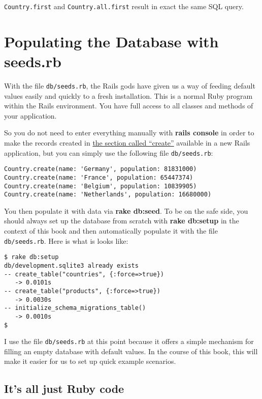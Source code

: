 \documentclass[a4paper]{book}
\newcounter{tab}[chapter]
\newcommand{\chap}[1]{\newpage\thispagestyle{empty}\chapter{#1}\label{chap:\thechapter}}
\begin{document}
\texttt{Country.first} and \texttt{Country.all.first} result in exact the same SQL query.

\chap{Populating the Database with seeds.rb}\label{populating-the-database-with-seeds.rb}

With the file \texttt{db/seeds.rb}, the Rails gods have given us a way of feeding default values easily and quickly to a fresh installation. This is a normal Ruby program within the Rails environment. You have full access to all classes and methods of your application.

So you do not need to enter everything manually with \textbf{rails console} in order to make the records created in \hyperref[activerecordux5fcreate]{the section called “create”} available in a new Rails application, but you can simply use the following file \texttt{db/seeds.rb}:

\begin{shaded}\begin{verbatim}
Country.create(name: 'Germany', population: 81831000)
Country.create(name: 'France', population: 65447374)
Country.create(name: 'Belgium', population: 10839905)
Country.create(name: 'Netherlands', population: 16680000)
\end{verbatim}\end{shaded}

You then populate it with data via \textbf{rake db:seed}. To be on the safe side, you should always set up the database from scratch with \textbf{rake db:setup} in the context of this book and then automatically populate it with the file \texttt{db/seeds.rb}. Here is what is looks like:

\begin{shaded}\begin{verbatim}
$ rake db:setup
db/development.sqlite3 already exists
-- create_table("countries", {:force=>true})
   -> 0.0101s
-- create_table("products", {:force=>true})
   -> 0.0030s
-- initialize_schema_migrations_table()
   -> 0.0010s
$
\end{verbatim}\end{shaded}

I use the file \texttt{db/seeds.rb} at this point because it offers a simple mechanism for filling an empty database with default values. In the course of this book, this will make it easier for us to set up quick example scenarios.

\section{It's all just Ruby code}\label{its-all-just-ruby-code}
\end{document}
